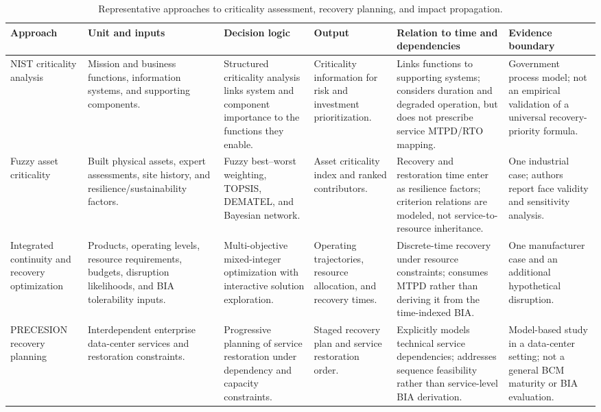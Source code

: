 \begin{table}
\centering
\caption{Representative approaches to criticality assessment, recovery planning, and impact propagation.}
\label{tab:lr_prioritization_methods}
\footnotesize
\renewcommand{\arraystretch}{1.15}
\setlength{\tabcolsep}{4pt}
\begin{tabularx}{\linewidth}{>{\raggedright\arraybackslash}p{2.8cm} >{\raggedright\arraybackslash}X >{\raggedright\arraybackslash}X >{\raggedright\arraybackslash}p{2.7cm} >{\raggedright\arraybackslash}X >{\raggedright\arraybackslash}X}
\toprule
\textbf{Approach} & \textbf{Unit and inputs} & \textbf{Decision logic} & \textbf{Output} & \textbf{Relation to time and dependencies} & \textbf{Evidence boundary} \\
\midrule
NIST criticality analysis \cite{nist2018criticality} & Mission and business functions, information systems, and supporting components. & Structured criticality analysis links system and component importance to the functions they enable. & Criticality information for risk and investment prioritization. & Links functions to supporting systems; considers duration and degraded operation, but does not prescribe service MTPD/RTO mapping. & Government process model; not an empirical validation of a universal recovery-priority formula. \\
Fuzzy asset criticality \cite{assetcriticality2023} & Built physical assets, expert assessments, site history, and resilience/sustainability factors. & Fuzzy best--worst weighting, TOPSIS, DEMATEL, and Bayesian network. & Asset criticality index and ranked contributors. & Recovery and restoration time enter as resilience factors; criterion relations are modeled, not service-to-resource inheritance. & One industrial case; authors report face validity and sensitivity analysis. \\
Integrated continuity and recovery optimization \cite{sahebjamnia2015integrated} & Products, operating levels, resource requirements, budgets, disruption likelihoods, and BIA tolerability inputs. & Multi-objective mixed-integer optimization with interactive solution exploration. & Operating trajectories, resource allocation, and recovery times. & Discrete-time recovery under resource constraints; consumes MTPD rather than deriving it from the time-indexed BIA. & One manufacturer case and an additional hypothetical disruption. \\
PRECESION recovery planning \cite{elshekeil2017precesion} & Interdependent enterprise data-center services and restoration constraints. & Progressive planning of service restoration under dependency and capacity constraints. & Staged recovery plan and service restoration order. & Explicitly models technical service dependencies; addresses sequence feasibility rather than service-level BIA derivation. & Model-based study in a data-center setting; not a general BCM maturity or BIA evaluation. \\

\end{tabularx}
\end{table}
